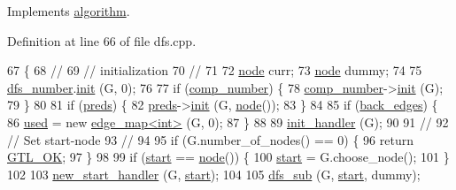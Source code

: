 Implements \mbox{\hyperlink{classalgorithm_a734b189509a8d6b56b65f8ff772d43ca}{algorithm}}.



Definition at line 66 of file dfs.\+cpp.


\begin{DoxyCode}
67 \{
68     \textcolor{comment}{//}
69     \textcolor{comment}{// initialization}
70     \textcolor{comment}{// }
71 
72     \mbox{\hyperlink{classnode}{node}} curr;
73     \mbox{\hyperlink{classnode}{node}} dummy;
74     
75     \mbox{\hyperlink{classdfs_a99727f2274d6af63daae4f0518f3adbe}{dfs\_number}}.\mbox{\hyperlink{classne__map_a4ef2ab4aebcb57a7a101975bf6a88e24}{init}} (G, 0);
76     
77     \textcolor{keywordflow}{if} (\mbox{\hyperlink{classdfs_a00db016ac7eab69045cae408008890c1}{comp\_number}}) \{
78     \mbox{\hyperlink{classdfs_a00db016ac7eab69045cae408008890c1}{comp\_number}}->\mbox{\hyperlink{classne__map_a4ef2ab4aebcb57a7a101975bf6a88e24}{init}} (G);
79     \}
80 
81     \textcolor{keywordflow}{if} (\mbox{\hyperlink{classdfs_a3fdeb5a211a1bc1753b2a637258c5355}{preds}}) \{
82     \mbox{\hyperlink{classdfs_a3fdeb5a211a1bc1753b2a637258c5355}{preds}}->\mbox{\hyperlink{classne__map_a4ef2ab4aebcb57a7a101975bf6a88e24}{init}} (G, \mbox{\hyperlink{classnode}{node}}());
83     \}
84 
85     \textcolor{keywordflow}{if} (\mbox{\hyperlink{classdfs_a1dc18a7df8d6b238d5301c92fc7540fa}{back\_edges}}) \{
86     \mbox{\hyperlink{classdfs_afc18288747491be301d6d8d85d8f220b}{used}} = \textcolor{keyword}{new} \mbox{\hyperlink{classedge__map}{edge\_map<int>}} (G, 0);
87     \}
88 
89     \mbox{\hyperlink{classdfs_aae46a50d0c73c63bf72e483668fd22a2}{init\_handler}} (G);
90 
91     \textcolor{comment}{//}
92     \textcolor{comment}{// Set start-node }
93     \textcolor{comment}{// }
94 
95     \textcolor{keywordflow}{if} (G.number\_of\_nodes() == 0) \{
96     \textcolor{keywordflow}{return} \mbox{\hyperlink{classalgorithm_af1a0078e153aa99c24f9bdf0d97f6710a5114c20e4a96a76b5de9f28bf15e282b}{GTL\_OK}};
97     \}
98 
99     \textcolor{keywordflow}{if} (\mbox{\hyperlink{classdfs_af677cfc31fe06a18dd3a3aae7f7d112b}{start}} == \mbox{\hyperlink{classnode}{node}}()) \{
100     \mbox{\hyperlink{classdfs_af677cfc31fe06a18dd3a3aae7f7d112b}{start}} = G.choose\_node();
101     \} 
102     
103     \mbox{\hyperlink{classdfs_a304b14458fb78f9feb3d8d5683d3cab5}{new\_start\_handler}} (G, \mbox{\hyperlink{classdfs_af677cfc31fe06a18dd3a3aae7f7d112b}{start}});
104     
105     \mbox{\hyperlink{classdfs_ad10b710339b289a61723aef52fbcb5b4}{dfs\_sub}} (G, \mbox{\hyperlink{classdfs_af677cfc31fe06a18dd3a3aae7f7d112b}{start}}, dummy);

\end{DoxyCode}
